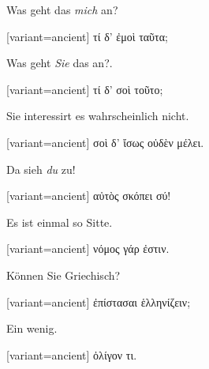 Was geht das \emph{mich} an?

\switchcolumn

\begin{greek}[variant=ancient]%
τί δ' ἐμοὶ ταῦτα;

\end{greek}%
\switchcolumn*

Was geht \emph{Sie} das an?.

\switchcolumn

\begin{greek}[variant=ancient]%
τί δ' σοὶ τοῦτο;

\end{greek}%
\switchcolumn*

Sie interessirt es wahrscheinlich nicht.

\switchcolumn

\begin{greek}[variant=ancient]%
σοὶ δ' ἴσως οὐδὲν μέλει.

\end{greek}%
\switchcolumn*

Da sieh \emph{du} zu!

\switchcolumn

\begin{greek}[variant=ancient]%
αὐτὸς σκόπει σύ!

\end{greek}%
\switchcolumn*

Es ist einmal so Sitte.

\switchcolumn

\begin{greek}[variant=ancient]%
νόμος γάρ ἐστιν.

\end{greek}%
\indent Können Sie Griechisch?

\switchcolumn

\begin{greek}[variant=ancient]%
ἐπίστασαι ἑλληνίζειν;

\end{greek}%
\switchcolumn*

Ein wenig.

\switchcolumn

\begin{greek}[variant=ancient]%
ὀλίγον τι.

\end{greek}%
\switchcolumn*

